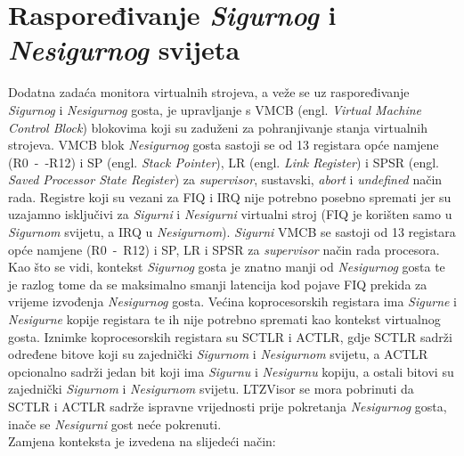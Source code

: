 \documentclass[times, utf8, diplomski, numeric]{fer}
\begin{document}
\section{Raspoređivanje \textit{Sigurnog} i \textit{Nesigurnog} svijeta}
Dodatna zadaća monitora virtualnih strojeva, a veže se uz raspoređivanje \textit{Sigurnog} i \textit{Nesigurnog} gosta, je upravljanje s
VMCB (engl. \textit{Virtual Machine Control Block}) blokovima koji su zaduženi za pohranjivanje stanja virtualnih strojeva.
VMCB blok \textit{Nesigurnog} gosta sastoji se od 13 registara opće namjene (R0~-~-R12) i SP (engl. \textit{Stack Pointer}), LR
(engl. \textit{Link Register}) i SPSR (engl. \textit{Saved Processor State Register}) za \textit{supervisor}, sustavski,
\textit{abort} i \textit{undefined} način rada. Registre koji su vezani za FIQ i IRQ nije potrebno posebno spremati jer su
uzajamno isključivi za \textit{Sigurni} i \textit{Nesigurni} virtualni stroj (FIQ je korišten samo u \textit{Sigurnom} svijetu, a IRQ u \textit{Nesigurnom}).
\textit{Sigurni} VMCB se sastoji od 13 registara opće namjene (R0~-~R12) i SP, LR i SPSR za \textit{supervisor} način rada procesora.
Kao što se vidi, kontekst \textit{Sigurnog} gosta je znatno manji od \textit{Nesigurnog} gosta te je razlog tome da se maksimalno smanji
latencija kod pojave FIQ prekida za vrijeme izvođenja \textit{Nesigurnog} gosta. Većina koprocesorskih registara ima \textit{Sigurne} i \textit{Nesigurne}
kopije registara te ih nije potrebno spremati kao kontekst virtualnog gosta. Iznimke koprocesorskih registara su SCTLR i
ACTLR, gdje SCTLR sadrži određene bitove koji su zajednički \textit{Sigurnom} i \textit{Nesigurnom} svijetu, a ACTLR opcionalno sadrži jedan
bit koji ima \textit{Sigurnu} i \textit{Nesigurnu} kopiju, a ostali bitovi su zajednički \textit{Sigurnom} i \textit{Nesigurnom} svijetu. LTZVisor se mora pobrinuti
da SCTLR i ACTLR sadrže ispravne vrijednosti prije pokretanja \textit{Nesigurnog} gosta, inače se \textit{Nesigurni} gost neće pokrenuti.\\
Zamjena konteksta je izvedena na slijedeći način:
\end{document}
